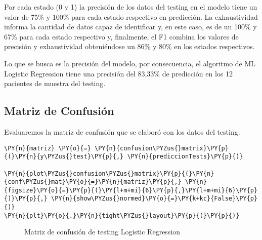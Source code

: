 	Por cada estado (0 y 1) la precisión de los datos del testing en el modelo tiene un valor de 75\%  y 100\% para cada estado respectivo en predicción. La exhaustividad informa la cantidad de datos capaz de identificar y, en este caso, es de un 100\% y 67\% para cada estado respectivo y, finalmente, el F1 combina los valores de precisión y exhaustividad obteniéndose un 86\% y 80\% en los estados respectivos. 
\par Lo que se busca es la precisión del modelo, por consecuencia, el algoritmo de ML Logistic Regression tiene una precisión del 83,33\% de predicción en los 12 pacientes de muestra del testing.\\

    \hypertarget{matriz-de-confusiuxf3n}{%
\subsection{Matriz de Confusión}\label{matriz-de-confusiuxf3n}}

Evaluaremos la matriz de confusión que se elaboró con los datos del testing.

    \begin{tcolorbox}[breakable, size=fbox, boxrule=1pt, pad at break*=1mm,colback=cellbackground, colframe=cellborder]
\begin{Verbatim}[commandchars=\\\{\}]
\PY{n}{matriz} \PY{o}{=} \PY{n}{confusion\PYZus{}matrix}\PY{p}{(}\PY{n}{y\PYZus{}test}\PY{p}{,} \PY{n}{prediccionTests}\PY{p}{)}

\PY{n}{plot\PYZus{}confusion\PYZus{}matrix}\PY{p}{(}\PY{n}{conf\PYZus{}mat}\PY{o}{=}\PY{n}{matriz}\PY{p}{,} \PY{n}{figsize}\PY{o}{=}\PY{p}{(}\PY{l+m+mi}{6}\PY{p}{,}\PY{l+m+mi}{6}\PY{p}{)}\PY{p}{,} \PY{n}{show\PYZus{}normed}\PY{o}{=}\PY{k+kc}{False}\PY{p}{)}
\PY{n}{plt}\PY{o}{.}\PY{n}{tight\PYZus{}layout}\PY{p}{(}\PY{p}{)}
\end{Verbatim}
\end{tcolorbox}

\begin{center}
    	\begin{figure}[H]
	\centering
	\caption{Matriz de confusión de testing Logistic Regression }
	\label{fig:mctlr}
	\end{figure}
\end{center}

